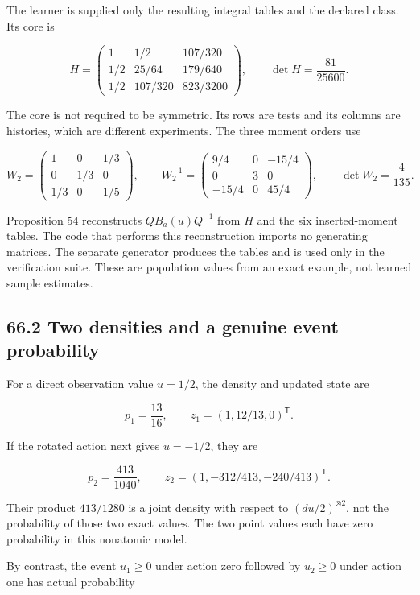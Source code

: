 The learner is supplied only the resulting integral tables and the
declared class. Its core is

\[
\boxed{
H=\begin{pmatrix}
1&1/2&107/320\\
1/2&25/64&179/640\\
1/2&107/320&823/3200
\end{pmatrix},\qquad\det H=\frac{81}{25600}.
}
\]

The core is not required to be symmetric. Its rows are tests and its
columns are histories, which are different experiments. The three moment
orders use

\[
W_2=\begin{pmatrix}1&0&1/3\\0&1/3&0\\1/3&0&1/5\end{pmatrix},
\qquad
W_2^{-1}=\begin{pmatrix}9/4&0&-15/4\\0&3&0\\-15/4&0&45/4\end{pmatrix},
\qquad\det W_2=\frac4{135}.
\]

Proposition 54 reconstructs \(QB_a(u)Q^{-1}\) from \(H\) and the six
inserted-moment tables. The code that performs this reconstruction
imports no generating matrices. The separate generator produces the
tables and is used only in the verification suite. These are population
values from an exact example, not learned sample estimates.

\subsection{66.2 Two densities and a genuine event
probability}\label{LSM:two-densities-and-a-genuine-event-probability}

For a direct observation value \(u=1/2\), the density and updated state
are

\[
p_1=\frac{13}{16},\qquad z_1=(1,12/13,0)^{\mathsf T}.
\]

If the rotated action next gives \(u=-1/2\), they are

\[
p_2=\frac{413}{1040},\qquad
z_2=(1,-312/413,-240/413)^{\mathsf T}.
\]

Their product \(413/1280\) is a joint density with respect to
\((du/2)^{\otimes2}\), not the probability of those two exact values.
The two point values each have zero probability in this nonatomic model.

By contrast, the event \(u_1\geq0\) under action zero followed by
\(u_2\geq0\) under action one has actual probability

